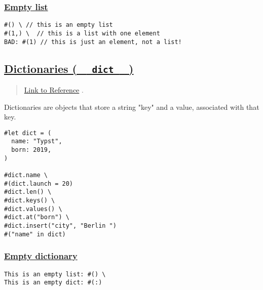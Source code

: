 \pandocbounded{}

\subsubsection{\texorpdfstring{\hyperref[empty-list]{Empty
list}}{Empty list}}\label{empty-list}

\begin{verbatim}
#() \ // this is an empty list
#(1,) \  // this is a list with one element
BAD: #(1) // this is just an element, not a list!
\end{verbatim}

\pandocbounded{}

\subsection{\texorpdfstring{\hyperref[dictionaries-dict]{Dictionaries (
\texttt{\ }{\texttt{\ dict\ }}\texttt{\ }
)}}{Dictionaries (   dict   )}}\label{dictionaries-dict}

\begin{quote}
\href{https://typst.app/docs/reference/foundations/dictionary/}{Link to
Reference} .
\end{quote}

Dictionaries are objects that store a string "key" and a value,
associated with that key.

\begin{verbatim}
#let dict = (
  name: "Typst",
  born: 2019,
)

#dict.name \
#(dict.launch = 20)
#dict.len() \
#dict.keys() \
#dict.values() \
#dict.at("born") \
#dict.insert("city", "Berlin ")
#("name" in dict)
\end{verbatim}

\pandocbounded{}

\subsubsection{\texorpdfstring{\hyperref[empty-dictionary]{Empty
dictionary}}{Empty dictionary}}\label{empty-dictionary}

\begin{verbatim}
This is an empty list: #() \
This is an empty dict: #(:)
\end{verbatim}

